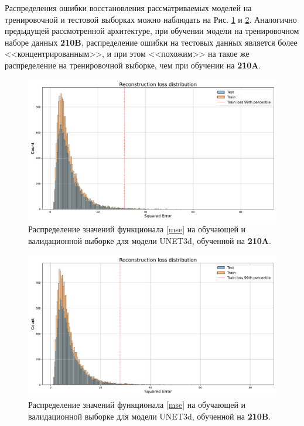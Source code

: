 \documentclass{article}
\begin{document}
    Распределения ошибки восстановления рассматриваемых моделей на тренировочной и тестовой выборках можно наблюдать на Рис. \ref{unet_loss_distr_before} и \ref{unet_loss_distr_after}. Аналогично предыдущей рассмотренной архитектуре, при обучении модели на тренировочном наборе данных \textbf{210B}, распределение ошибки на тестовых данных является более <<концентрированным>>, и при этом <<похожим>> на такое же распределение на тренировочной выборке, чем при обучении на \textbf{210A}.

    \begin{figure}[]
            \centering
            \includegraphics[scale=.3]{unet_loss_distr_before.pdf}
            \caption{Распределение значений функционала \eqref{mse} на обучающей и валидационной выборке для модели UNET3d, обученной на \textbf{210A}.}\label{unet_loss_distr_before}
    \end{figure}
    \begin{figure}[]
            \centering
            \includegraphics[scale=.3]{unet_loss_distr_after.pdf}
            \caption{Распределение значений функционала \eqref{mse} на обучающей и валидационной выборке для модели UNET3d, обученной на \textbf{210B}.}\label{unet_loss_distr_after}
    \end{figure}
\end{document}
